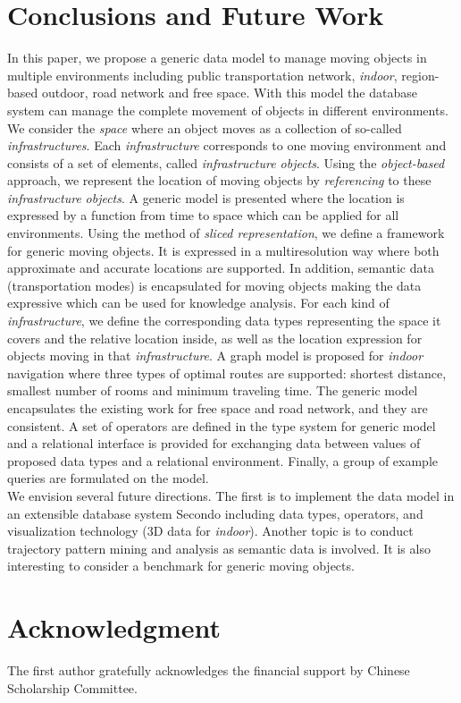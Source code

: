 \section{Conclusions and Future Work}
\label{sec:conclusions}
In this paper, we propose a generic data model to manage moving objects in multiple
environments including public transportation network, \textit{indoor}, region-based outdoor, 
road network and free space. With this model the database system can manage the complete
movement of objects in different environments. We consider the \textit{space} where an object moves as a collection of so-called \textit{infrastructures}. 
Each \textit{infrastructure} corresponds to one moving environment and  
consists of a set of elements, called \textit{infrastructure objects}. Using the \textit{object-based} approach, we represent the location of moving objects by \textit{referencing} to these \textit{infrastructure} \textit{objects}. A generic model is presented where the location is 
expressed by a function from time to space which can be applied for all environments. 
Using the method of \textit{sliced representation}, we define a framework for generic 
moving objects. It is expressed in a multiresolution way where both approximate and accurate 
locations are supported.  In addition, semantic data (transportation modes) is encapsulated for moving objects making the data expressive which 
can be used for knowledge analysis. For each kind of \textit{infrastructure}, we define the corresponding data types representing the space it covers and the relative location inside, 
as well as the location expression for objects moving in that \textit{infrastructure}. A graph model is proposed for \textit{indoor} navigation where three types of optimal routes are supported: shortest distance, smallest number of rooms and minimum traveling time. The generic model encapsulates 
the existing work for free space and road network, and they are consistent. A set of operators are defined in the type system for generic model and a relational interface is provided for exchanging data between values of proposed data types and a relational environment. Finally, a group of example queries are formulated on the model. \\

We envision several future directions. The first is to implement the data model in an 
extensible database system Secondo including data types, operators, and visualization technology 
(3D data for \textit{indoor}). Another topic is to conduct trajectory pattern mining and analysis as
semantic data is involved. It is also interesting to consider a benchmark for generic moving objects. 

\section*{Acknowledgment}
\label{sec:acknowledgement}
The first author gratefully acknowledges the financial support by Chinese Scholarship Committee. 
